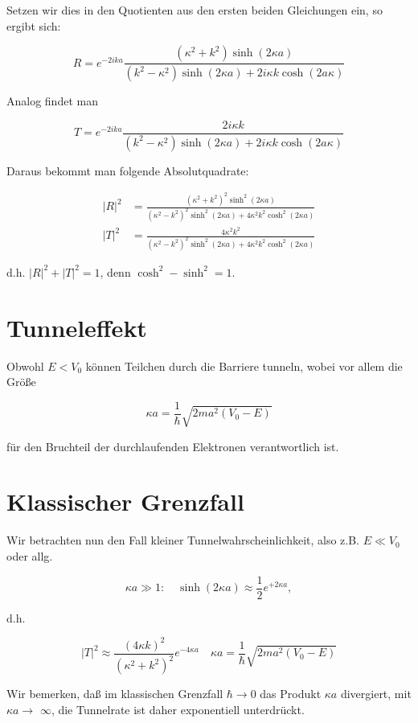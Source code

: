 \documentclass[10pt, letterpaper]{article}
\begin{document}
Setzen wir dies in den Quotienten aus den ersten beiden Gleichungen ein, so ergibt sich:

$$
R=e^{-2 i k a} \frac{\left(\kappa^{2}+k^{2}\right) \sinh (2 \kappa a)}{\left(k^{2}-\kappa^{2}\right) \sinh (2 \kappa a)+2 i \kappa k \cosh (2 a \kappa)}
$$

Analog findet man

$$
T=e^{-2 i k a} \frac{2 i \kappa k}{\left(k^{2}-\kappa^{2}\right) \sinh (2 \kappa a)+2 i \kappa k \cosh (2 a \kappa)}
$$

Daraus bekommt man folgende Absolutquadrate:

$$
\begin{aligned}
|R|^{2} & =\frac{\left(\kappa^{2}+k^{2}\right)^{2} \sinh ^{2}(2 \kappa a)}{\left(\kappa^{2}-k^{2}\right)^{2} \sinh ^{2}(2 \kappa a)+4 \kappa^{2} k^{2} \cosh ^{2}(2 \kappa a)} \\
|T|^{2} & =\frac{4 \kappa^{2} k^{2}}{\left(\kappa^{2}-k^{2}\right)^{2} \sinh ^{2}(2 \kappa a)+4 \kappa^{2} k^{2} \cosh ^{2}(2 \kappa a)}
\end{aligned}
$$

d.h. $|R|^{2}+|T|^{2}=1$, denn $\cosh ^{2}-\sinh ^{2}=1$.

\section*{Tunneleffekt}
Obwohl $E<V_{0}$ können Teilchen durch die Barriere tunneln, wobei vor allem die Größe

$$
\kappa a=\frac{1}{\hbar} \sqrt{2 m a^{2}\left(V_{0}-E\right)}
$$

für den Bruchteil der durchlaufenden Elektronen verantwortlich ist.

\section*{Klassischer Grenzfall}
Wir betrachten nun den Fall kleiner Tunnelwahrscheinlichkeit, also z.B. $E \ll V_{0}$ oder allg.

$$
\kappa a \gg 1: \quad \sinh (2 \kappa a) \approx \frac{1}{2} e^{+2 \kappa a},
$$

d.h.

$$
|T|^{2} \approx \frac{(4 \kappa k)^{2}}{\left(\kappa^{2}+k^{2}\right)^{2}} e^{-4 \kappa a} \quad \kappa a=\frac{1}{\hbar} \sqrt{2 m a^{2}\left(V_{0}-E\right)}
$$

Wir bemerken, daß im klassischen Grenzfall $\hbar \rightarrow 0$ das Produkt $\kappa a$ divergiert, mit $\kappa a \rightarrow$ $\infty$, die Tunnelrate ist daher exponentiell unterdrückt.
\end{document}
